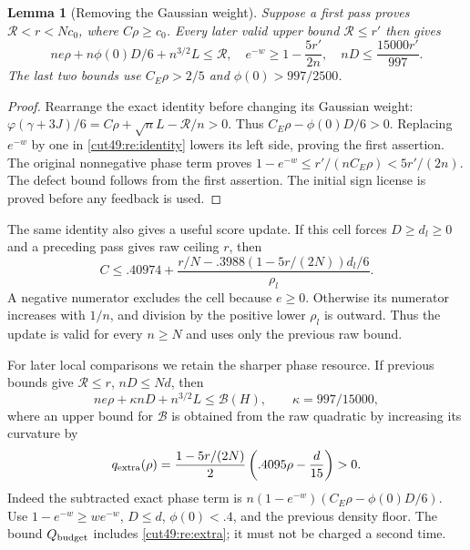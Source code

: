 \documentclass[11pt,a4paper]{article}
\numberwithin{equation}{section}
\newtheorem{lemma}[theorem]{Lemma}
\theoremstyle{definition}
\theoremstyle{remark}
\begin{document}
\begin{lemma}[Removing the Gaussian weight]\label{cut49:re:weight}
Suppose a first pass proves $\mathcal R<r<Nc_0$, where $C\rho\ge c_0$.
Every later valid upper bound $\mathcal R\le r'$ then gives
\begin{equation}\label{cut49:re:unweighted}
 ne\rho+n\phi(0)D/6+n^{3/2}L\le\mathcal R,
 \quad e^{-w}\ge1-\frac{5r'}{2n},
 \quad nD\le\frac{15000r'}{997}.
\end{equation}
The last two bounds use $C_E\rho>2/5$ and $\phi(0)>997/2500$.
\end{lemma}
\begin{proof}
Rearrange the exact identity before changing its Gaussian weight:
$\varphi(\gamma+3J)/6=C\rho+\sqrt nL-\mathcal R/n>0$.
Thus $C_E\rho-\phi(0)D/6>0$. Replacing $e^{-w}$ by one in
\eqref{cut49:re:identity} lowers its left side, proving the first assertion.
The original nonnegative phase term proves
$1-e^{-w}\le r'/(nC_E\rho)<5r'/(2n)$. The defect bound follows from
the first assertion. The initial sign license is proved before any
feedback is used.
\end{proof}

The same identity also gives a useful score update. If this cell forces
$D\ge d_l\ge0$ and a preceding pass gives raw ceiling $r$, then
\[
 C\le .40974+
 \frac{r/N-.3988(1-5r/(2N))d_l/6}{\rho_l}.
\]
A negative numerator excludes the cell because $e\ge0$. Otherwise its
numerator increases with $1/n$, and division by the positive lower
$\rho_l$ is outward. Thus the update is valid for every $n\ge N$ and
uses only the previous raw bound.

For later local comparisons we retain the sharper phase resource.
If previous bounds give $\mathcal R\le r$, $nD\le Nd$, then
\begin{equation}\label{cut49:re:phaseprice}
 ne\rho+\kappa nD+n^{3/2}L
 \le \mathcal B(H),\qquad \kappa=997/15000,
\end{equation}
where an upper bound for $\mathcal B$ is obtained from the raw
quadratic by increasing its curvature by
\begin{equation}\label{cut49:re:extra}
 q_{\rm extra}(\rho)=\frac{1-5r/(2N)}2
                         \left(.4095\rho-\frac d{15}\right)>0.
\end{equation}
Indeed the subtracted exact phase term is
$n(1-e^{-w})(C_E\rho-\phi(0)D/6)$.
Use $1-e^{-w}\ge we^{-w}$, $D\le d$, $\phi(0)<.4$, and the
previous density floor. The bound $Q_{\rm budget}$ includes
\eqref{cut49:re:extra}; it must not be charged a second time.
\end{document}
